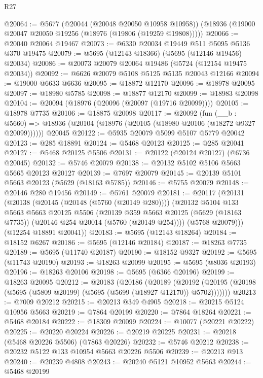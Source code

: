 \begin{lexlean}{R27}
\begin{coremodule}
@20064 := @5677
    (@20044 (@20048 @20050 @10958 @10958))
    (@18936 (@19000 @20047 @20050 @19256 (@18976 (@19806 (@19259 @19808)))))
@20066 := @20040 @20064 @19467
@20073 := @6330 @20034 @19449 @511 @5095 @5136 @370 @19475
@20079 := @5695 (@12143 @18366) (@5695 (@12146 @19456) @20034)
@20086 := @20073 @20079 @20064 @19486 (@5724 (@12154 @19475 @20034))
@20092 := @6626 @20079 @5108 @5125 @5135 @20043 @12166
@20094 := @19000 @6633 @6636
@20095 := @18872 @12170
@20096 := @18978 @20095
@20097 := @18980 @5785
@20098 := @18877 @12170
@20099 := @18983 @20098
@20104 := @20094 (@18976 (@20096 (@20097 (@19716 @20099))))
@20105 := @18978 @7735
@20106 := @18875 @20098
@20117 := @20092
    (fun (__b : @5660) => @18936 (@20104 (@18976 (@20105 (@18980 @20106 (@18272 @9327 @20099))))))
    @20045
@20122 := @5935 @20079 @5099 @5107 @5779 @20042
@20123 := @285 @18891
@20124 := @5468 @20123
@20125 := @285 @20041
@20127 := @5468 @20125 @5506
@20131 := @20122 (@20124 @20127) (@6736 @20045)
@20132 := @5746 @20079
@20138 := @20132 @5102 @5106 @5663 @5665 @20123 @20127
@20139 := @7697 @20079
@20145 := @20139 @5101 @5663 @20123 (@5629 (@18163 @5785))
@20146 := @5755 @20079
@20148 := @20146 @280 @19456
@20149 := @5761 @20079
@20181 := @20117
    (@20131
      (@20138
        (@20145 (@20148 (@5760 (@20149 @280))))
        (@20132
          @5104
          @133
          @5663
          @5663
          @20125
          @5506
          (@20139
            @359
            @5663
            @20125
            (@5629 (@18163 @7735))
            (@20146 @254 @20014 (@5760 (@20149 @254))))
          (@5768 @20079)))
      (@12254 @18891 @20041))
@20183 := @5695 (@12143 @18264)
@20184 := @18152 @6267
@20186 := @5695 (@12146 @20184)
@20187 := @18263 @7735
@20189 := @5695 (@11740 @20187)
@20190 := @18152 @9327
@20192 := @5695 (@11743 @20190)
@20193 := @18263 @20099
@20195 := @5695 (@8036 @20193)
@20196 := @18263 @20106
@20198 := @5695 (@6366 @20196)
@20199 := @18263 @20095
@20212 := @20183
    (@20186
      (@20189
        (@20192 (@20195 (@20198 (@5695 (@5809 @20199) (@5695 (@5699 (@18927 @12170)) @5702)))))))
@20213 := @7009 @20212
@20215 := @20213 @349 @4905
@20218 := @20215 @5124 @10956 @5663
@20219 := @7864 @20199
@20220 := @7864 @18264
@20221 := @5468 @20184
@20222 := @18309 @20099
@20224 := @10077 (@20221 @20222)
@20225 := @20220 @20224
@20226 := @20219 @20225
@20231 := @20218 (@5468 @20226 @5506) (@7863 @20226)
@20232 := @5746 @20212
@20238 := @20232 @5122 @133 @10954 @5663 @20226 @5506
@20239 := @20213 @913
@20240 := @20239 @4808
@20243 := @20240 @5121 @10952 @5663
@20244 := @5468 @20199

\end{coremodule}
\end{lexlean}
